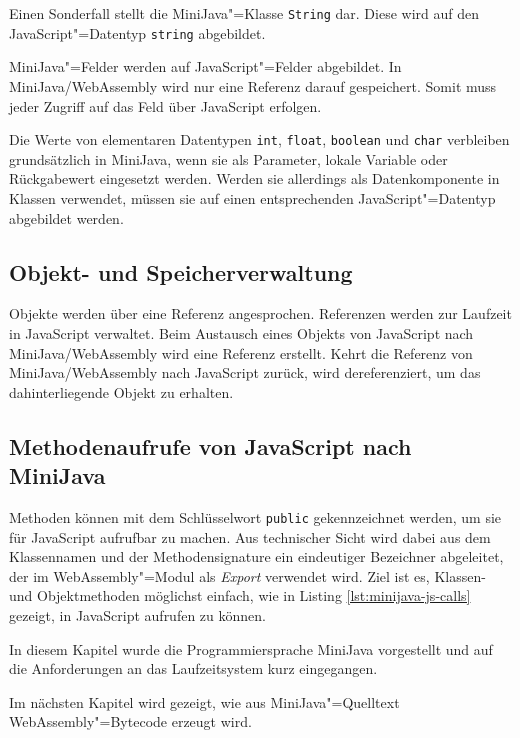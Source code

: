Einen Sonderfall stellt die MiniJava"=Klasse \lstinline{String} dar. Diese wird auf den JavaScript"=Datentyp \lstinline{string} abgebildet.

MiniJava"=Felder werden auf JavaScript"=Felder abgebildet. In MiniJava/WebAssembly wird nur eine Referenz darauf gespeichert. Somit muss jeder Zugriff auf das Feld über JavaScript erfolgen.

Die Werte von elementaren Datentypen \lstinline{int}, \lstinline{float}, \lstinline{boolean} und \lstinline{char} verbleiben grundsätzlich in MiniJava, wenn sie als Parameter, lokale Variable oder Rückgabewert eingesetzt werden. Werden sie allerdings als Datenkomponente in Klassen verwendet, müssen sie auf einen entsprechenden JavaScript"=Datentyp abgebildet werden.

\subsection{Objekt- und Speicherverwaltung}
Objekte werden über eine Referenz angesprochen. Referenzen werden zur Laufzeit in JavaScript verwaltet. Beim Austausch eines Objekts von JavaScript nach MiniJava/WebAssembly wird eine Referenz erstellt. Kehrt die Referenz von MiniJava/WebAssembly nach JavaScript zurück, wird dereferenziert, um das dahinterliegende Objekt zu erhalten.

\pagebreak
\subsection{Methodenaufrufe von JavaScript nach MiniJava}
Methoden können mit dem Schlüsselwort \lstinline{public} gekennzeichnet werden, um sie für JavaScript aufrufbar zu machen. Aus technischer Sicht wird dabei aus dem Klassennamen und der Methodensignature ein eindeutiger Bezeichner abgeleitet, der im WebAssembly"=Modul als \emph{Export} verwendet wird. Ziel ist es, Klassen- und Objektmethoden möglichst einfach, wie in Listing \ref{lst:minijava-js-calls} gezeigt, in JavaScript aufrufen zu können.



\vspace{4em}
In diesem Kapitel wurde die Programmiersprache MiniJava vorgestellt und auf die Anforderungen an das Laufzeitsystem kurz eingegangen.

Im nächsten Kapitel wird gezeigt, wie aus MiniJava"=Quelltext WebAssembly"=Bytecode erzeugt wird.
